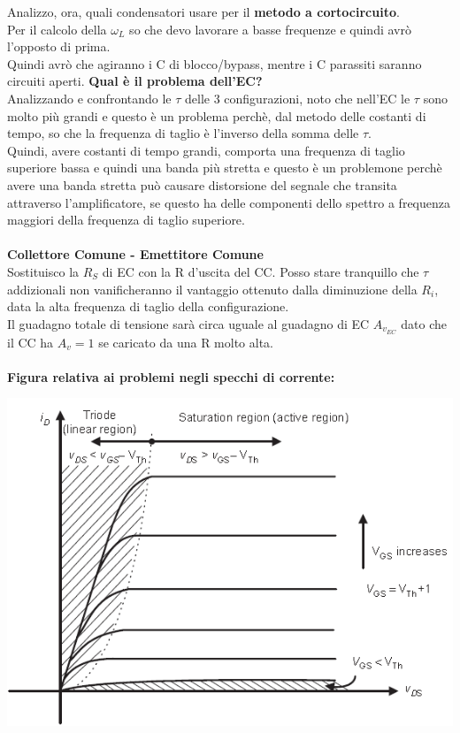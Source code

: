 \documentclass{article}
\begin{document}
Analizzo, ora, quali condensatori usare per il \textbf{metodo a cortocircuito}.\\
Per il calcolo della $ \omega_{L} $
so che devo lavorare a basse frequenze e quindi avrò l'opposto di prima.\\ Quindi avrò che agiranno i C di blocco/bypass, mentre i C parassiti saranno circuiti aperti.
\newpage
\noindent
\textbf{Qual è il problema dell'EC?} \\
Analizzando e confrontando le $ \tau $ delle 3 configurazioni, noto che nell'EC le $ \tau $ sono molto più grandi e questo è un problema perchè, dal metodo delle costanti di tempo, so che la frequenza di taglio è l'inverso della somma delle $ \tau.$ \\
Quindi, avere costanti di tempo grandi, comporta una frequenza di taglio superiore bassa e quindi una banda più stretta e questo è un problemone perchè avere una banda stretta può causare distorsione del segnale che transita attraverso l'amplificatore, se questo ha delle componenti dello spettro a frequenza maggiori della frequenza di taglio superiore. \\ \\
\textbf{Collettore Comune - Emettitore Comune}\\
Sostituisco la $R_{S}$ di EC con la R d'uscita del CC.
Posso stare tranquillo che $\tau$ addizionali non vanificheranno il vantaggio ottenuto dalla diminuzione della $R_{i}$, data la alta frequenza di taglio della configurazione.\\
Il guadagno totale di tensione sarà circa uguale al guadagno di EC $A_{v_{EC}}$  dato che il CC ha $A_{v}=1$ se caricato da una R molto alta.\\\\
\textbf{Figura relativa ai problemi negli specchi di corrente:}
\vspace{0.8mm}
\begin{center}
    \includegraphics[scale=0.8]{Mosfet.png}
\end{center}
\end{document}
